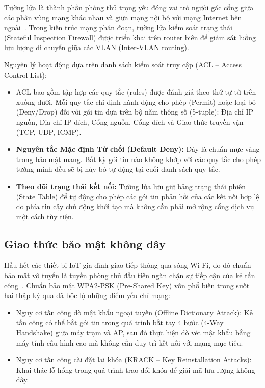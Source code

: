 Tường lửa là thành phần phòng thủ trọng yếu đóng vai trò người gác cổng giữa các phân vùng mạng khác nhau và giữa mạng nội bộ với mạng Internet bên ngoài~\cite{kurose2021computer}. Trong kiến trúc mạng phân đoạn, tường lửa kiểm soát trạng thái (Stateful Inspection Firewall) được triển khai trên router biên để giám sát luồng lưu lượng di chuyển giữa các VLAN (Inter-VLAN routing).

Nguyên lý hoạt động dựa trên danh sách kiểm soát truy cập (ACL -- Access Control List):
\begin{itemize}
    \item ACL bao gồm tập hợp các quy tắc (rules) được đánh giá theo thứ tự từ trên xuống dưới. Mỗi quy tắc chỉ định hành động cho phép (Permit) hoặc loại bỏ (Deny/Drop) đối với gói tin dựa trên bộ năm thông số (5-tuple): Địa chỉ IP nguồn, Địa chỉ IP đích, Cổng nguồn, Cổng đích và Giao thức truyền vận (TCP, UDP, ICMP).
    \item \textbf{Nguyên tắc Mặc định Từ chối (Default Deny):} Đây là chuẩn mực vàng trong bảo mật mạng. Bất kỳ gói tin nào không khớp với các quy tắc cho phép tường minh đều sẽ bị hủy bỏ tự động tại cuối danh sách quy tắc.
    \item \textbf{Theo dõi trạng thái kết nối:} Tường lửa lưu giữ bảng trạng thái phiên (State Table) để tự động cho phép các gói tin phản hồi của các kết nối hợp lệ do phía tin cậy chủ động khởi tạo mà không cần phải mở rộng cổng dịch vụ một cách tùy tiện.
\end{itemize}

\subsection{Giao thức bảo mật không dây}
\label{subsec:giao-thuc-bao-mat-khong-day}

Hầu hết các thiết bị IoT gia đình giao tiếp thông qua sóng Wi-Fi, do đó chuẩn bảo mật vô tuyến là tuyến phòng thủ đầu tiên ngăn chặn sự tiếp cận của kẻ tấn công~\cite{wpa3spec2020}. Chuẩn bảo mật WPA2-PSK (Pre-Shared Key) vốn phổ biến trong suốt hai thập kỷ qua đã bộc lộ những điểm yếu chí mạng:
\begin{itemize}
    \item Nguy cơ tấn công dò mật khẩu ngoại tuyến (Offline Dictionary Attack): Kẻ tấn công có thể bắt gói tin trong quá trình bắt tay 4 bước (4-Way Handshake) giữa máy trạm và AP, sau đó thực hiện dò vét mật khẩu bằng máy tính cấu hình cao mà không cần duy trì kết nối với mạng mục tiêu.
    \item Nguy cơ tấn công cài đặt lại khóa (KRACK -- Key Reinstallation Attacks): Khai thác lỗ hổng trong quá trình trao đổi khóa để giải mã lưu lượng không dây.
\end{itemize}

